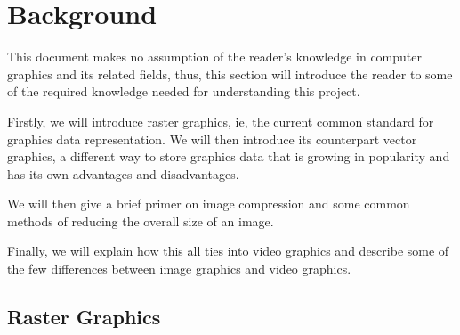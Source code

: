 \documentclass[12pt]{article}
\newcommand{\sentence}{} %
\begin{document}


    \pagebreak


    \section{Background}\label{sec:background}

    \tab
    This document makes no assumption of the reader's knowledge in computer graphics and its related fields,
    thus, this section will introduce the reader to some of the required knowledge needed for understanding this
    project.
    \sentence
    Firstly, we will introduce raster graphics, ie, the current common standard for graphics data representation.
    We will then introduce its counterpart vector graphics, a different way to store graphics data that is growing in
    popularity and has its own advantages and disadvantages.
    \sentence
    We will then give a brief primer on image compression and some common methods of reducing the overall size
    of an image.
    \sentence
    Finally, we will explain how this all ties into video graphics and describe some of the few differences between
    image graphics and video graphics.

    \subsection{Raster Graphics}\label{subsec:raster-graphics}

\end{document}
